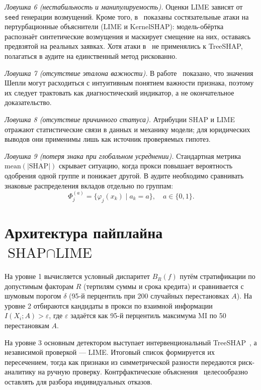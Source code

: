 \documentclass{misisarticle}
\begin{document}
\emph{Ловушка 6 (нестабильность и манипулируемость).} Оценки LIME зависят от \texttt{seed} генерации возмущений. Кроме того, в~\cite{slack2020} показаны состязательные атаки на пертурбационные объяснители (LIME и KernelSHAP): модель-обёртка распознаёт синтетические возмущения и маскирует смещение на них, оставаясь предвзятой на реальных заявках. Хотя атаки в~\cite{slack2020} не применялись к TreeSHAP, полагаться в аудите на единственный метод рискованно.

\emph{Ловушка 7 (отсутствие эталона важности).} В работе~\cite{kumar2020} показано, что значения Шепли могут расходиться с интуитивным понятием важности признака, поэтому их следует трактовать как диагностический индикатор, а не окончательное доказательство.

\emph{Ловушка 8 (отсутствие причинного статуса).} Атрибуции SHAP и LIME отражают статистические связи в данных и механику модели; для юридических выводов они применимы лишь как источник проверяемых гипотез.

\emph{Ловушка 9 (потеря знака при глобальном усреднении).} Стандартная метрика $\mathrm{mean}(|\mathrm{SHAP}|)$ скрывает ситуацию, когда прокси повышает вероятность одобрения одной группе и понижает другой. В аудите необходимо сравнивать знаковые распределения вкладов отдельно по группам:
\begin{equation}
\Phi_j^{(a)} = \{\varphi_j(x_k) \mid a_k = a\}, \quad a \in \{0, 1\}.
\label{eq:signed_groups}
\end{equation}

\section{Архитектура пайплайна $\text{SHAP} \cap \text{LIME}$}

На уровне 1 вычисляется условный диспаритет $B_R(f)$ путём стратификации по допустимым факторам $R$ (тертилям суммы и срока кредита) и сравнивается с шумовым порогом $\delta$ (95-й перцентиль при 200 случайных перестановках $A$). На уровне 2 отбираются кандидаты в прокси по взаимной информации $I(X_i; A) > \varepsilon$, где $\varepsilon$ задаётся как 95-й перцентиль максимума MI по 50 перестановкам $A$.

На уровне 3 основным детектором выступает интервенциональный TreeSHAP~\cite{lundberg2020}, а независимой проверкой — LIME. Итоговый список формируется их пересечением, тогда как признаки из симметрической разности передаются риск-аналитику на ручную проверку. Контрфактические объяснения~\cite{wachter2018} целесообразно оставлять для разбора индивидуальных отказов.
\end{document}
